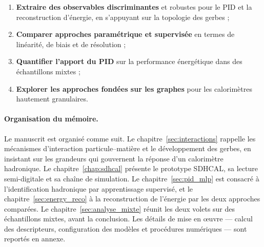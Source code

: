 \begin{enumerate}[label=\arabic*.,leftmargin=1.6em]
    \item \textbf{Extraire des observables discriminantes} et robustes pour le PID et la reconstruction d’énergie, en s’appuyant sur la topologie des gerbes ;
    \item \textbf{Comparer approches paramétrique et supervisée} en termes de linéarité, de biais et de résolution ;
    \item \textbf{Quantifier l’apport du PID} sur la performance énergétique dans des échantillons mixtes ;
    \item \textbf{Explorer les approches fondées sur les graphes} pour les calorimètres hautement granulaires.
\end{enumerate}

\paragraph{Organisation du mémoire.}

Le manuscrit est organisé comme suit. Le chapitre~\ref{sec:interactions} rappelle les mécanismes d’interaction particule--matière et le développement des gerbes, en insistant sur les grandeurs qui gouvernent la réponse d’un calorimètre hadronique. Le chapitre~\ref{chap:sdhcal} présente le prototype SDHCAL, sa lecture semi-digitale et sa chaîne de simulation. Le chapitre~\ref{sec:pid_mlp} est consacré à l’identification hadronique par apprentissage supervisé, et le chapitre~\ref{sec:energy_reco} à la reconstruction de l’énergie par les deux approches comparées. Le chapitre~\ref{sec:analyse_mixte} réunit les deux volets sur des échantillons mixtes, avant la conclusion. Les détails de mise en œuvre — calcul des descripteurs, configuration des modèles et procédures numériques — sont reportés en annexe.
